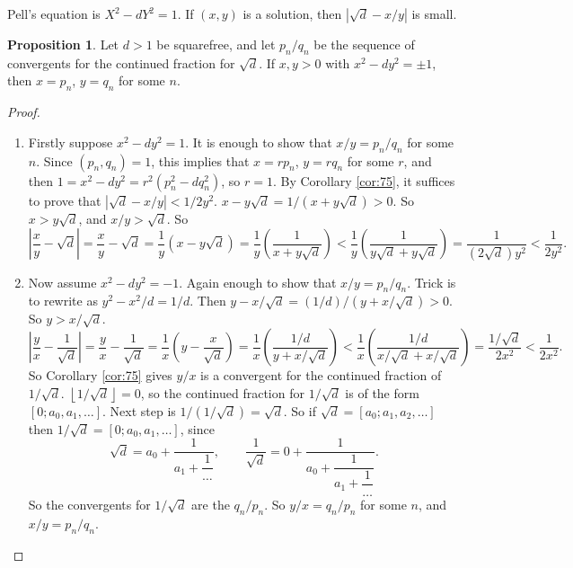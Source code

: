 \documentclass{article}
\newcommand{\rb}[1]{\left( #1 \right)}
\renewcommand{\sb}[1]{\left[ #1 \right]}
\newcommand{\abs}[1]{\left\lvert #1 \right\rvert}
\newcommand{\fb}[1]{\left\lfloor #1 \right\rfloor}
\theoremstyle{definition}\newtheorem{definition}{Definition}
\theoremstyle{definition}\newtheorem{remark}[definition]{Remark}
\theoremstyle{definition}\newtheorem*{example}{Example}
\theoremstyle{definition}\newtheorem*{note}{Note}
\newtheorem{proposition}[definition]{Proposition}
\begin{document}

Pell's equation is $ X^2 - dY^2 = 1 $. If $ \rb{x, y} $ is a solution, then $ \abs{\sqrt{d} - x / y} $ is small.

\begin{proposition}
Let $ d > 1 $ be squarefree, and let $ p_n / q_n $ be the sequence of convergents for the continued fraction for $ \sqrt{d} $. If $ x, y > 0 $ with $ x^2 - dy^2 = \pm 1 $, then $ x = p_n $, $ y = q_n $ for some $ n $.
\end{proposition}

\begin{proof}
\hfill
\begin{enumerate}
\item Firstly suppose $ x^2 - dy^2 = 1 $. It is enough to show that $ x / y = p_n / q_n $ for some $ n $. Since $ \rb{p_n, q_n} = 1 $, this implies that $ x = rp_n $, $ y = rq_n $ for some $ r $, and then $ 1 = x^2 - dy^2 = r^2\rb{p_n^2 - dq_n^2} $, so $ r = 1 $. By Corollary \ref{cor:75}, it suffices to prove that $ \abs{\sqrt{d} - x / y} < 1 / 2y^2 $. $ x - y\sqrt{d} = 1 / \rb{x + y\sqrt{d}} > 0 $. So $ x > y\sqrt{d} $, and $ x / y > \sqrt{d} $. So
$$ \abs{\dfrac{x}{y} - \sqrt{d}} = \dfrac{x}{y} - \sqrt{d} = \dfrac{1}{y}\rb{x - y\sqrt{d}} = \dfrac{1}{y}\rb{\dfrac{1}{x + y\sqrt{d}}} < \dfrac{1}{y}\rb{\dfrac{1}{y\sqrt{d} + y\sqrt{d}}} = \dfrac{1}{\rb{2\sqrt{d}}y^2} < \dfrac{1}{2y^2}. $$
\item Now assume $ x^2 - dy^2 = -1 $. Again enough to show that $ x / y = p_n / q_n $. Trick is to rewrite as $ y^2 - x^2 / d = 1 / d $. Then $ y - x / \sqrt{d} = \rb{1 / d} / \rb{y + x / \sqrt{d}} > 0 $. So $ y > x / \sqrt{d} $.
$$ \abs{\dfrac{y}{x} - \dfrac{1}{\sqrt{d}}} = \dfrac{y}{x} - \dfrac{1}{\sqrt{d}} = \dfrac{1}{x}\rb{y - \dfrac{x}{\sqrt{d}}} = \dfrac{1}{x}\rb{\dfrac{1 / d}{y + x / \sqrt{d}}} < \dfrac{1}{x}\rb{\dfrac{1 / d}{x / \sqrt{d} + x / \sqrt{d}}} = \dfrac{1 / \sqrt{d}}{2x^2} < \dfrac{1}{2x^2}. $$
So Corollary \ref{cor:75} gives $ y / x $ is a convergent for the continued fraction of $ 1 / \sqrt{d} $. $ \fb{1 / \sqrt{d}} = 0 $, so the continued fraction for $ 1 / \sqrt{d} $ is of the form $ \sb{0; a_0, a_1, \dots} $. Next step is $ 1 / \rb{1 / \sqrt{d}} = \sqrt{d} $. So if $ \sqrt{d} = \sb{a_0; a_1, a_2, \dots} $ then $ 1 / \sqrt{d} = \sb{0; a_0, a_1, \dots} $, since
$$ \sqrt{d} = a_0 + \dfrac{1}{a_1 + \dfrac{1}{\dots}}, \qquad \dfrac{1}{\sqrt{d}} = 0 + \dfrac{1}{a_0 + \dfrac{1}{a_1 + \dfrac{1}{\dots}}}. $$
So the convergents for $ 1 / \sqrt{d} $ are the $ q_n / p_n $. So $ y / x = q_n / p_n $ for some $ n $, and $ x / y = p_n / q_n $.
\end{enumerate}
\end{proof}
\end{document}
